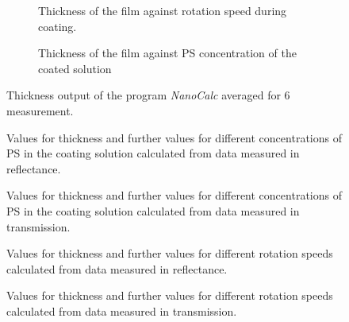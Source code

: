 \begin{figure}[h]
    \centering
    \begin{subfigure}[b]{\textwidth}
        \centering
        
        \caption{Thickness of the film against rotation speed during coating.}
        \label{fig:VglMethConcThick}
    \end{subfigure}

    \vspace{1cm}
    \begin{subfigure}[b]{\textwidth}
        \centering
           
        \caption{Thickness of the film against PS concentration of the coated solution} 
        \label{fig:VglMethRotThick}
    \end{subfigure}

    \caption{Thickness output of the program \textit{NanoCalc} averaged for 6 measurement.}
    \label{fig:thickconcrpm}
\end{figure}

\begin{figure}[h]
    
    \caption{Values for thickness and further values for different concentrations of PS in the coating solution calculated from data measured in reflectance.}
    \label{tab:ConcThickRef}
\end{figure}

\begin{figure}[h]
    
    \caption{Values for thickness and further values for different concentrations of PS in the coating solution calculated from data measured in transmission.}
    \label{tab:ConcThickTrans}
\end{figure}

\begin{figure}[h]
    
    \caption{Values for thickness and further values for different rotation speeds calculated from data measured in reflectance.}
    \label{tab:RotThickRef}
\end{figure}

\begin{figure}[h]
    
    \caption{Values for thickness and further values for different rotation speeds calculated from data measured in transmission.}
    \label{tab:RotThickTrans}
\end{figure}